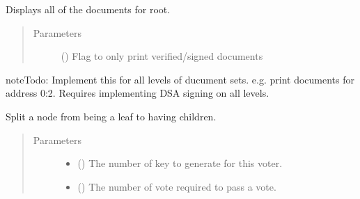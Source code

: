 \documentclass[letterpaper,10pt,english]{sphinxmanual}
\begin{document}
\begin{fulllineitems}
\begin{fulllineitems}
\label{\detokenize{index:ThresTree.TreeNode.show_documents}}
Displays all of the documents for root.
\begin{quote}\begin{description}
\item[{Parameters}] \leavevmode
{} () \textendash{} Flag to only print verified/signed documents

\end{description}\end{quote}

\begin{sphinxadmonition}{note}{Todo:}
Implement this for all levels of ducument sets. e.g. print documents for address 0:2.
Requires implementing DSA signing on all levels.
\end{sphinxadmonition}

\end{fulllineitems}


\begin{fulllineitems}
\label{\detokenize{index:ThresTree.TreeNode.split}}
Split a node from being a leaf to having children.
\begin{quote}\begin{description}
\item[{Parameters}] \leavevmode\begin{itemize}
\item {} 
 () \textendash{} The number of key to generate for this voter.

\item {} 
 () \textendash{} The number of vote required to pass a vote.

\end{itemize}

\end{description}\end{quote}

\end{fulllineitems}



\end{fulllineitems}
\end{document}
